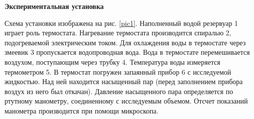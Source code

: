 \documentclass[a4paper, 12pt]{article}
\begin{document}
    \newpage
    
    \begin{flushleft}
        {\Large {\bf Экспериментальная установка}}
    \end{flushleft}
    
    Схема установки изображена на рис. \ref{pic1}. Наполненный водой резервуар 1 играет роль термостата. Нагревание термостата производится спиралью 2, подогреваемой электрическим током. Для охлаждения воды в термостате через змеевик 3 пропускается водопроводная вода. Вода в термостате перемешивается воздухом, поступающим через трубку 4. Температура воды измеряется термометром 5. В термостат погружен запаянный прибор 6 с исследуемой жидкостью. Над ней находится насыщенный пар (перед заполнением прибора воздух из него был откачан). Давление насыщенного пара определяется по ртутному манометру, соединенному с исследуемым объемом. Отсчет показаний манометра производится при помощи микроскопа.
    
\end{document}
